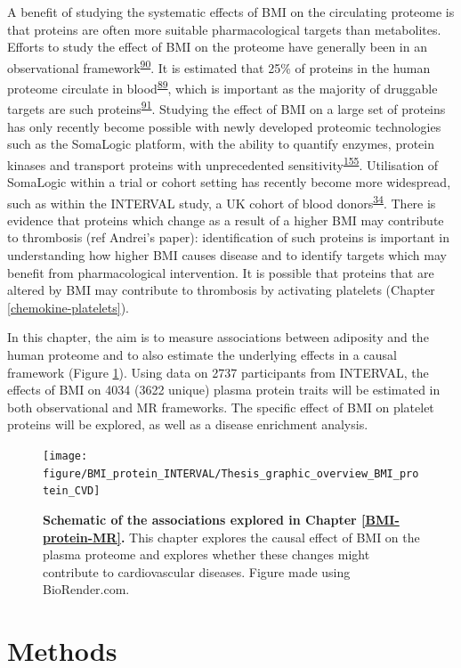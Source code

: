 \documentclass[11pt,twoside]{bristolthesis}
\begin{document}
A benefit of studying the systematic effects of BMI on the circulating proteome is that proteins are often more suitable pharmacological targets than metabolites. Efforts to study the effect of BMI on the proteome have generally been in an observational framework\textsuperscript{\protect\hyperlink{ref-Cominetti2018}{90}}. It is estimated that 25\% of proteins in the human proteome circulate in blood\textsuperscript{\protect\hyperlink{ref-Gold2012}{89}}, which is important as the majority of druggable targets are such proteins\textsuperscript{\protect\hyperlink{ref-Imming2006}{91}}. Studying the effect of BMI on a large set of proteins has only recently become possible with newly developed proteomic technologies such as the SomaLogic platform, with the ability to quantify enzymes, protein kinases and transport proteins with unprecedented sensitivity\textsuperscript{\protect\hyperlink{ref-Rohloff2014}{155}}. Utilisation of SomaLogic within a trial or cohort setting has recently become more widespread, such as within the INTERVAL study, a UK cohort of blood donors\textsuperscript{\protect\hyperlink{ref-Sun2018}{34}}. There is evidence that proteins which change as a result of a higher BMI may contribute to thrombosis (ref Andrei's paper): identification of such proteins is important in understanding how higher BMI causes disease and to identify targets which may benefit from pharmacological intervention. It is possible that proteins that are altered by BMI may contribute to thrombosis by activating platelets (Chapter \ref{chemokine-platelets}).

In this chapter, the aim is to measure associations between adiposity and the human proteome and to also estimate the underlying effects in a causal framework (Figure \ref{fig:BMI-protein-graphic-INT}). Using data on 2737 participants from INTERVAL, the effects of BMI on 4034 (3622 unique) plasma protein traits will be estimated in both observational and MR frameworks. The specific effect of BMI on platelet proteins will be explored, as well as a disease enrichment analysis.



\begin{figure}

{\centering \texttt{[image: figure/BMI\_protein\_INTERVAL/Thesis\_graphic\_overview\_BMI\_protein\_CVD]} 

}

\caption[Schematic of the associations explored in /\textsuperscript{\protect\hyperlink{ref-ref}{\textbf{ref?}}}(BMI-protein-MR).]{\textbf{Schematic of the associations explored in Chapter \ref{BMI-protein-MR}.} This chapter explores the causal effect of BMI on the plasma proteome and explores whether these changes might contribute to cardiovascular diseases. Figure made using BioRender.com.}\label{fig:BMI-protein-graphic-INT}
\end{figure}
\hypertarget{methods-2}{%
\section{Methods}\label{methods-2}}
\end{document}
